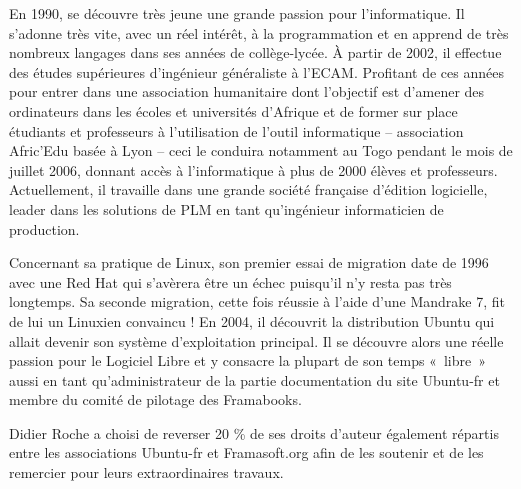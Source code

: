 
En 1990,  se découvre très jeune une grande passion pour l'informatique. Il s'adonne très vite, avec un réel intérêt, à la programmation et en apprend de très nombreux langages dans ses années de collège-lycée. À partir de 2002, il effectue des études supérieures d'ingénieur généraliste à l'ECAM. Profitant de ces années pour entrer dans une association humanitaire dont l'objectif est d'amener des ordinateurs dans les écoles et universités d'Afrique et de former sur place étudiants et professeurs à l'utilisation de l'outil informatique -- association Afric'Edu basée à Lyon -- ceci le conduira notamment au Togo pendant le mois de juillet 2006, donnant accès à l'informatique à plus de 2000 élèves et professeurs. Actuellement, il travaille dans une grande société française d'édition logicielle, leader dans les solutions de PLM en tant qu'ingénieur informaticien de production.\par
Concernant sa pratique de Linux, son premier essai de migration date de 1996 avec une Red Hat qui s'avèrera être un échec puisqu'il n'y resta pas très longtemps. Sa seconde migration, cette fois réussie à l'aide d'une Mandrake 7, fit de lui un Linuxien convaincu ! En 2004, il découvrit la distribution Ubuntu qui allait devenir son système d'exploitation principal. Il se découvre alors une réelle passion pour le Logiciel Libre et y consacre la plupart de son temps «~libre~» aussi en tant qu'administrateur de la partie documentation du site Ubuntu-fr et membre du comité de pilotage des Framabooks.\par
Didier Roche a choisi de reverser 20 \% de ses droits d'auteur également répartis entre les associations Ubuntu-fr et Framasoft.org afin de les soutenir et de les remercier pour leurs extraordinaires travaux.\par
